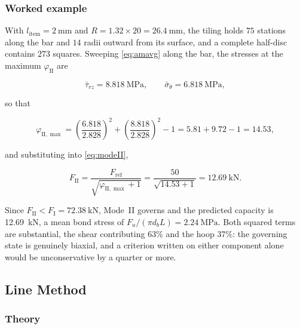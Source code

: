 \subsubsection*{Worked example}

With $l_{\mathrm{item}} = \SI{2}{\milli\metre}$ and
$R = 1.32 \times 20 = \SI{26.4}{\milli\metre}$, the tiling holds $75$
stations along the bar and $14$ radii outward from its surface, and a
complete half-disc contains $273$ squares. Sweeping \eqref{eq:amavg} along
the bar, the stresses at the maximum $\varphi_{\mathrm{II}}$ are

\begin{equation*}
\bar{\tau}_{rz} = \SI{8.818}{\mega\pascal},
\qquad
\bar{\sigma}_\theta = \SI{6.818}{\mega\pascal},
\end{equation*}

so that

\begin{equation*}
\varphi_{\mathrm{II},\max}
 = \left(\frac{6.818}{2.828}\right)^{2} + \left(\frac{8.818}{2.828}\right)^{2} - 1
 = 5.81 + 9.72 - 1 = 14.53,
\end{equation*}

and substituting into \eqref{eq:modeII},

\begin{equation*}
F_{\mathrm{II}} = \frac{F_{\mathrm{ref}}}{\sqrt{\varphi_{\mathrm{II},\max} + 1}}
 = \frac{50}{\sqrt{14.53 + 1}} = \SI{12.69}{\kilo\newton}.
\end{equation*}

Since $F_{\mathrm{II}} < F_{\mathrm{I}} = \SI{72.38}{\kilo\newton}$, Mode~II
governs and the predicted capacity is \SI{12.69}{\kilo\newton}, a mean bond
stress of $F_u/(\pi d_b L) = \SI{2.24}{\mega\pascal}$. Both squared terms are
substantial, the shear contributing $63\%$ and the hoop $37\%$: the governing
state is genuinely biaxial, and a criterion written on either component alone
would be unconservative by a quarter or more.

\subsection{Line Method}
\label{sec:linemethod}
 
\subsubsection*{Theory}
 
